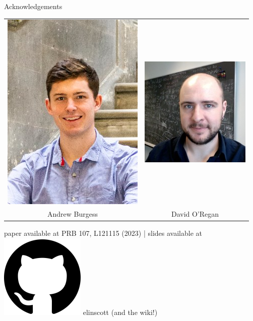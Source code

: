 \documentclass[xcolor=table,aspectratio=169]{beamer}
\numberwithin{equation}{section}
\begin{document}
\begin{frame}{Acknowledgements}

    \begin{center}
        \footnotesize
        \begin{tabularx}{0.5\textwidth}{CC}
            \includegraphics[height = 0.4\paperheight]{photos/andrew_burgess.png} &
            \includegraphics[height = 0.4\paperheight]{figures/david_oregan.jpg}    \\
            Andrew Burgess                                                        &
            David O'Regan                                                           \\
        \end{tabularx}
    \end{center}

    \vspace{1ex}
    \begin{center}
        paper available at PRB 107, L121115 (2023) | slides available at \includegraphics[height=\fontcharht\font`\B]{logos/github-favicon.png} elinscott (and the wiki!)
    \end{center}



\end{frame}
\end{document}
